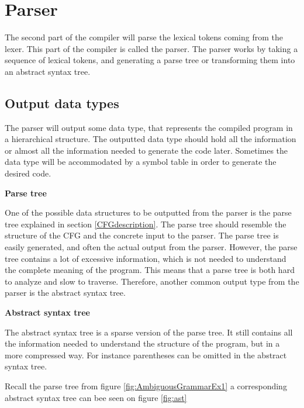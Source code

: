 \section{Parser}

The second part of the compiler will parse the lexical tokens coming from the lexer. 
This part of the compiler is called the parser. 
The parser works by taking a sequence of lexical tokens, and generating a parse tree or transforming them into an abstract syntax tree. 

\subsection{Output data types}

The parser will output some data type, that represents the compiled program in a hierarchical structure. 
The outputted data type should hold all the information or almost all the information needed to generate the code later. 
Sometimes the data type will be accommodated by a symbol table in order to generate the desired code.

\textbf{Parse tree}

One of the possible data structures to be outputted from the parser is the parse tree explained in section \ref{CFGdescription}. 
The parse tree should resemble the structure of the CFG and the concrete input to the parser. 
The parse tree is easily generated, and often the actual output from the parser. 
However, the parse tree contains a lot of excessive information, which is not needed to understand the complete meaning of the program. 
This means that a parse tree is both hard to analyze and slow to traverse. 
Therefore, another common output type from the parser is the abstract syntax tree.

\textbf{Abstract syntax tree}

The abstract syntax tree is a sparse version of the parse tree. 
It still contains all the information needed to understand the structure of the program, but in a more compressed way. 
For instance parentheses can be omitted in the abstract syntax tree.

Recall the parse tree from figure \ref{fig:AmbiguousGrammarEx1} a corresponding abstract syntax tree can bee seen on figure \ref{fig:ast} 

